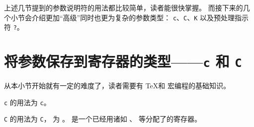 \documentclass[openany]{book}
\begin{document}
上述几节提到的参数说明符的用法都比较简单，读者能很快掌握。
而接下来的几个小节会介绍更加“高级”同时也更为复杂的参数类型：
\texttt c、\texttt C、\texttt K 以及预处理指示符 \texttt ?。

\section{将参数保存到寄存器的类型——\texttt c 和 \texttt C}

从本小节开始就有一定的难度了，读者需要有 \TeX 和 \LaTeXiii 宏编程的基础知识。

\texttt c 的用法为 \verb|c|。

\texttt C 的用法为 \verb|C|，
为 。 是一个已经用诸如
、 等分配了的寄存器。
\end{document}
